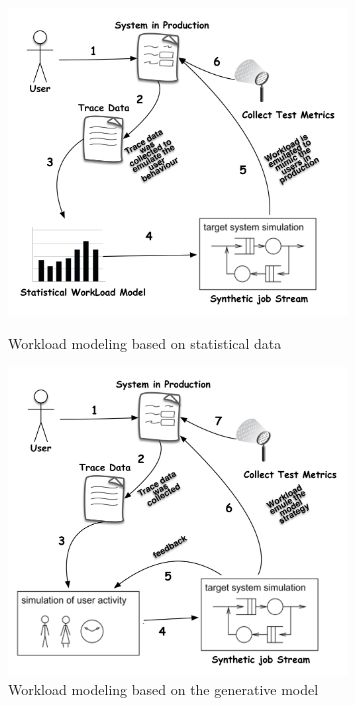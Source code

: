 \documentclass[times]{stvrauth}
\begin{document}
\begin{figure}[!ht]
\begin{minipage}{.5\textwidth}
\centering
\includegraphics[width=0.8\textwidth]{./images/workloadmodel1300dpi.png}
\caption{Workload modeling based on statistical data \cite{DiLucca2006}}
\label{fig:descriptivemodel}
\end{minipage}
\begin{minipage}{.5\textwidth}
\centering
\includegraphics[width=0.8\textwidth]{./images/workloadmodel2300dpi.png}
\caption{Workload modeling based on the generative model \cite{DiLucca2006}}
\label{fig:generativemodel}
\end{minipage}
\end{figure}
\end{document}

